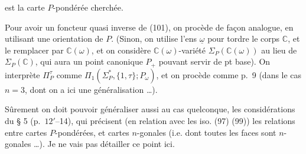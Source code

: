 est la carte $P$-pondérée  cherchée.

Pour avoir un foncteur quasi inverse de (101), on procède de façon analogue, en utilisant une orientation de $P$. (Sinon, on utilise l'ens $\underline\omega$ pour tordre le corps $\mathbb C$, et le remplacer par $\mathbb C(\omega)$, et on considère  $\mathbb C(\omega)$-variété $\Sigma_P(\mathbb C(\omega))$ au lieu de $\Sigma_P(\mathbb C)$, qui aura un point canonique $P_+$ pouvant servir de pt base). On  interprète $\Pi_P^\tau$ comme $\Pi_1(\Sigma_P^*,\{1,\tau\};P_\omega)$, et on procède comme p.~9 (dans le cas $n=3$, dont on a ici une généralisation \ldots).

Sûrement on doit pouvoir généraliser aussi au cas quelconque, les considérations du § 5 (p.~$12'$--14), qui précisent (en relation avec  les iso. (97) (99)) les relations entre cartes $P$-pondérées, et cartes $n$-gonales (i.e. dont toutes les faces sont $n$-gonales \ldots). Je ne vais pas détailler ce point ici.

